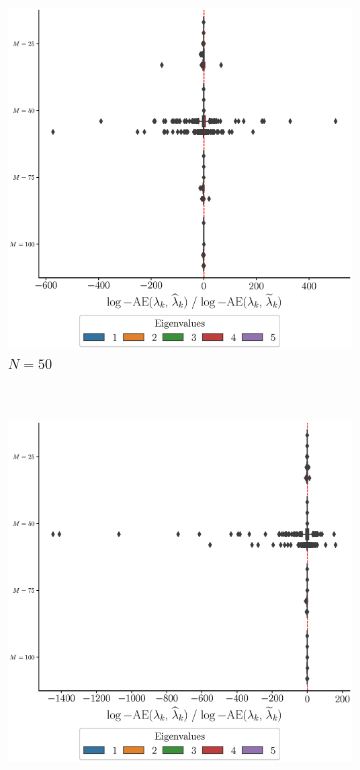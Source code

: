 \begin{results}
\begin{figure}
\begin{subfigure}[b]{0.49\textwidth}
         \includegraphics[width=\textwidth]{figures/scenario_2/logAE_N50.eps}
         \caption{$N = 50$}
         \label{fig:logAE_mfd_2d_50}
     \end{subfigure}
     \\
     \begin{subfigure}[b]{0.49\textwidth}
         \centering
         \includegraphics[width=\textwidth]{figures/scenario_2/logAE_N75.eps}

\end{subfigure}
\end{figure}
\end{results}
